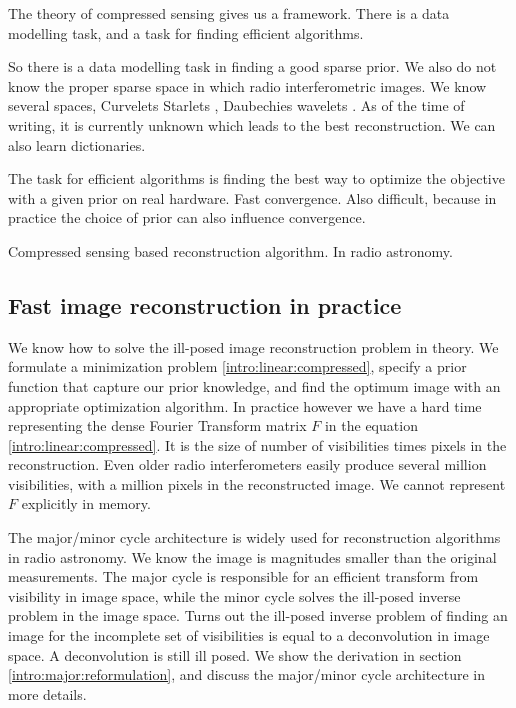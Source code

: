 The theory of compressed sensing gives us a framework. There is a data modelling task, and a task for finding efficient algorithms.

So there is a data modelling task in finding a good sparse prior.
We also do not know the proper sparse space in which radio interferometric images. We know several spaces, Curvelets \cite{starck2003astronomical} Starlets \cite{starck2015starlet}, Daubechies wavelets \cite{carrillo2012sparsity}. As of the time of writing, it is currently unknown which leads to the best reconstruction.
We can also learn dictionaries.

The task for efficient algorithms is finding the best way to optimize the objective with a given prior on real hardware. Fast convergence. Also difficult, because in practice the choice of prior can also influence convergence.


Compressed sensing based reconstruction algorithm. In radio astronomy.


\subsection{Fast image reconstruction in practice}\label{intro:major}
We know how to solve the ill-posed image reconstruction problem in theory. We formulate a minimization problem \eqref{intro:linear:compressed}, specify a prior function that capture our prior knowledge, and find the optimum image with an appropriate optimization algorithm. In practice however we have a hard time representing the dense Fourier Transform matrix $F$ in the equation \eqref{intro:linear:compressed}. It is the size of number of visibilities times pixels in the reconstruction. Even older radio interferometers easily produce several million visibilities, with a million pixels in the reconstructed image. We cannot represent $F$ explicitly in memory. 

The major/minor cycle architecture is widely used for reconstruction algorithms in radio astronomy.
We know the image is magnitudes smaller than the original measurements. 
The major cycle is responsible for an efficient transform from visibility in image space, while the minor cycle solves the ill-posed inverse problem in the image space.
Turns out the ill-posed inverse problem of finding an image for the incomplete set of visibilities is equal to a deconvolution in image space. A deconvolution is still ill posed.  We show the derivation in section \ref{intro:major:reformulation}, and discuss the major/minor cycle architecture in more details.

